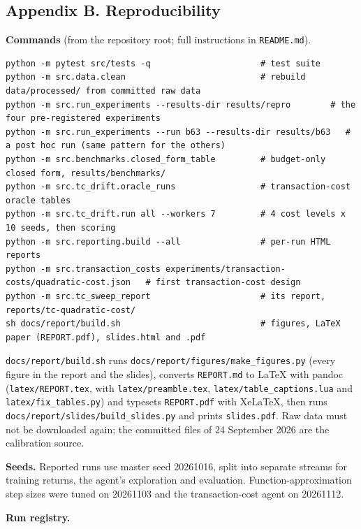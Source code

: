 \documentclass[
  11pt]{article}
\begin{document}
\subsection{Appendix B.
Reproducibility}\label{appendix-b.-reproducibility}

\textbf{Commands} (from the repository root; full instructions in
\texttt{README.md}).

\begin{verbatim}
python -m pytest src/tests -q                      # test suite
python -m src.data.clean                           # rebuild data/processed/ from committed raw data
python -m src.run_experiments --results-dir results/repro        # the four pre-registered experiments
python -m src.run_experiments --run b63 --results-dir results/b63   # a post hoc run (same pattern for the others)
python -m src.benchmarks.closed_form_table         # budget-only closed form, results/benchmarks/
python -m src.tc_drift.oracle_runs                 # transaction-cost oracle tables
python -m src.tc_drift.run all --workers 7         # 4 cost levels x 10 seeds, then scoring
python -m src.reporting.build --all                # per-run HTML reports
python -m src.transaction_costs experiments/transaction-costs/quadratic-cost.json   # first transaction-cost design
python -m src.tc_sweep_report                      # its report, reports/tc-quadratic-cost/
sh docs/report/build.sh                            # figures, LaTeX paper (REPORT.pdf), slides.html and .pdf
\end{verbatim}

\texttt{docs/report/build.sh} runs
\texttt{docs/report/figures/make\_figures.py} (every figure in the
report and the slides), converts \texttt{REPORT.md} to LaTeX with pandoc
(\texttt{latex/REPORT.tex}, with \texttt{latex/preamble.tex},
\texttt{latex/table\_captions.lua} and \texttt{latex/fix\_tables.py})
and typesets \texttt{REPORT.pdf} with XeLaTeX, then runs
\texttt{docs/report/slides/build\_slides.py} and prints
\texttt{slides.pdf}. Raw data must not be downloaded again; the
committed files of 24 September 2026 are the calibration source.

\textbf{Seeds.} Reported runs use master seed 20261016, split into
separate streams for training returns, the agent's exploration and
evaluation. Function-approximation step sizes were tuned on 20261103 and
the transaction-cost agent on 20261112.

\textbf{Run registry.}
\end{document}
